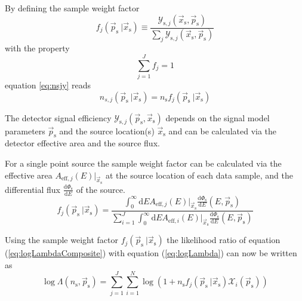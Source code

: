 \documentclass{article}
\newcommand{\eq}[1]{(\ref{#1})}
\newcommand{\ns}{n_{\mathrm{s}}}
\newcommand{\ps}{\vec{p}_{\mathrm{s}}}
\newcommand{\xs}{\vec{x}_{\mathrm{s}}}
\newcommand{\dPhisdE}{\frac{\mathrm{d}\Phi_{\mathrm{s}}}{\mathrm{d}E}}
\begin{document}
By defining the sample weight factor
\begin{equation}
 f_j(\ps~|\vec{x}_{\mathrm{s}}) \equiv \frac{\mathcal{Y}_{\mathrm{s},j}(\vec{x}_{\mathrm{s}},\ps)}{\sum_j \mathcal{Y}_{\mathrm{s},j}(\vec{x}_{\mathrm{s}},\ps)}
\end{equation}
with the property
\begin{equation}
 \sum_{j=1}^{J} f_j = 1
\end{equation}
equation \ref{eq:nsjy} reads
\begin{equation}
 n_{s,j}(\ps~|\vec{x}_{\mathrm{s}}) = \ns f_{j}(\ps~|\vec{x}_{\mathrm{s}})
 \label{eq:ns-sample-weight-factor}
\end{equation}

The detector signal efficiency $\mathcal{Y}_{\mathrm{s},j}(\ps,\xs)$
depends on the signal model parameters $\ps$ and the source location(s) $\xs$
and can be calculated via the detector effective area and the source flux.

For a single point source the sample weight factor can be calculated via the effective area
$A_{\mathrm{eff},j}(E)|_{\xs}$ at the source location of each data sample, and the
differential flux $\dPhisdE$ of the source.
\begin{equation}
 f_{j}(\ps~|\xs) = \frac{\int_0^\infty \mathrm{d}E A_{\mathrm{eff},j}(E)|_{\xs} \dPhisdE(E,\ps)}
		        {\sum_{i=1}^{J} \int_0^\infty \mathrm{d}E A_{\mathrm{eff},i}(E)|_{\xs} \dPhisdE(E,\ps)}
 \label{eq:fj}
\end{equation}

Using the sample weight factor $f_{j}(\ps~|\xs)$ the likelihood ratio of
equation \eq{eq:logLambdaComposite} with equation \eq{eq:logLambda} can now
be written as
\begin{equation}
 \log \Lambda(\ns,\ps) = \sum_{j=1}^{J} \sum_{i=1}^{N} \log (1 + \ns f_{j}(\ps~|\xs)\mathcal{X}_i(\ps))
\end{equation}
\end{document}
